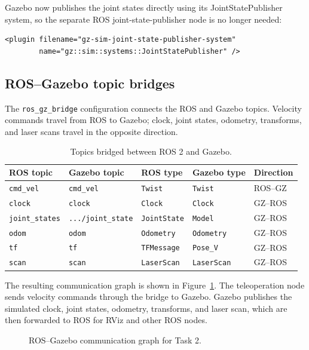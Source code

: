 \documentclass[10pt,a4paper]{article}
\begin{document}
Gazebo now publishes the joint states directly using its JointStatePublisher
system, so the separate ROS joint-state-publisher node is no longer needed:

\begin{lstlisting}[language=XACRO]
<plugin filename="gz-sim-joint-state-publisher-system"
        name="gz::sim::systems::JointStatePublisher" />
\end{lstlisting}

\subsection{ROS--Gazebo topic bridges}

The \texttt{ros\_gz\_bridge} configuration connects the ROS and Gazebo topics.
Velocity commands travel from ROS to Gazebo; clock, joint states, odometry,
transforms, and laser scans travel in the opposite direction.

\begin{table}[H]
\centering
\small
\begin{tabular}{@{}lllll@{}}
\toprule
ROS topic & Gazebo topic & ROS type & Gazebo type & Direction \\
\midrule
\texttt{cmd\_vel} & \texttt{cmd\_vel} & \texttt{Twist} & \texttt{Twist} & ROS--GZ \\
\texttt{clock} & \texttt{clock} & \texttt{Clock} & \texttt{Clock} & GZ--ROS \\
\texttt{joint\_states} & \texttt{.../joint\_state} & \texttt{JointState} & \texttt{Model} & GZ--ROS \\
\texttt{odom} & \texttt{odom} & \texttt{Odometry} & \texttt{Odometry} & GZ--ROS \\
\texttt{tf} & \texttt{tf} & \texttt{TFMessage} & \texttt{Pose\_V} & GZ--ROS \\
\texttt{scan} & \texttt{scan} & \texttt{LaserScan} & \texttt{LaserScan} & GZ--ROS \\
\bottomrule
\end{tabular}
\caption{Topics bridged between ROS 2 and Gazebo.}
\label{tab:topic-bridges}
\end{table}

The resulting communication graph is shown in Figure~\ref{fig:rosgraph}.  The
teleoperation node sends velocity commands through the bridge to Gazebo.  Gazebo
publishes the simulated clock, joint states, odometry, transforms, and laser
scan, which are then forwarded to ROS for RViz and other ROS nodes.

\begin{figure}[H]
  \centering
  
  \caption{ROS--Gazebo communication graph for Task 2.}
  \label{fig:rosgraph}
\end{figure}
\end{document}
